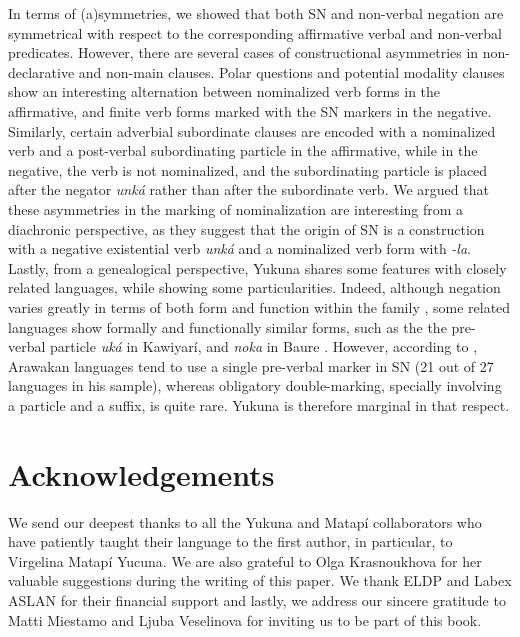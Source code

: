 \documentclass[output=paper,colorlinks,citecolor=brown]{langscibook}
\begin{document}
In terms of (a)symmetries, we showed that both SN and non-verbal negation are symmetrical with respect to the corresponding affirmative verbal and non-verbal predicates. However, there are several cases of constructional asymmetries in non-declarative and non-main clauses. Polar questions and potential modality clauses show an interesting alternation between nominalized verb forms in the affirmative, and finite verb forms marked with the SN markers in the negative. Similarly, certain adverbial subordinate clauses are encoded with a nominalized verb and a post-verbal subordinating particle in the affirmative, while in the negative, the verb is not nominalized, and the subordinating particle is placed after the negator \textit{unká} rather than after the subordinate verb. We  argued that these asymmetries in the marking of nominalization are interesting from a diachronic perspective, as they suggest that the origin of SN is a construction with a negative existential verb \textit{unká} and a nominalized verb form with \textit{-la}. 
Lastly, from a genealogical perspective, Yukuna shares some features with closely related languages, while showing some particularities. Indeed, although negation varies greatly in terms of both form and function within the family \citep[96]{Aikhenvald1999}, some  related languages show formally and functionally similar forms, such as the the pre-verbal particle \textit{uká} in Kawiyarí, and  \textit{noka} in Baure \citep[238]{Michael2014}. However, according to \citet[237]{Michael2014}, Arawakan languages tend to use a single pre-verbal marker in SN (21 out of 27 languages in his sample), whereas obligatory double-marking, specially involving a particle and a suffix, is quite rare. Yukuna is therefore marginal in that respect.

\section*{Acknowledgements}
\largerpage
We send our deepest thanks to all the Yukuna and Matapí collaborators who have patiently taught their language to the first author, in particular, to Virgelina Matapí Yucuna. We are also grateful to Olga Krasnoukhova for her valuable suggestions during the writing of this paper. We thank ELDP and Labex ASLAN for their financial support and lastly, we address our sincere gratitude to Matti Miestamo and Ljuba Veselinova for inviting us to be part of this book. 
\end{document}
